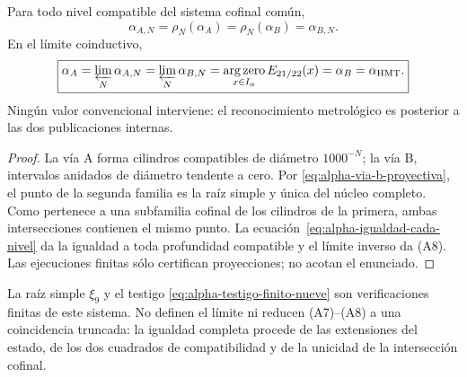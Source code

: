 \begin{theorem}
\label{prop:alpha-dos-limites-historico-rev04}
Para todo nivel compatible del sistema cofinal común,
\begingroup
\renewcommand{\theequation}{A7}
\begin{equation}
 \boxed{\alpha_{A,N}=\rho_N(\alpha_A)
 =\rho_N(\alpha_B)=\alpha_{B,N}.}
 \label{eq:alpha-dos-vias-cada-nivel-historico-rev04}
\end{equation}
\endgroup
En el límite coinductivo,
\begingroup
\renewcommand{\theequation}{A8}
\begin{equation}
 \boxed{\alpha_A
 =\varprojlim_N\alpha_{A,N}
 =\varprojlim_N\alpha_{B,N}
 =\operatorname*{arg\,zero}_{x\in I_\alpha}E_{21/22}(x)
 =\alpha_B=\alpha_{\mathrm{HMT}}.}
 \label{eq:alpha-dos-vias-limite-coinductivo-historico-rev04}
\end{equation}
\endgroup
Ningún valor convencional interviene: el reconocimiento metrológico es
posterior a las dos publicaciones internas.
\end{theorem}

\begin{proof}
La vía A forma cilindros compatibles de diámetro \(1000^{-N}\); la vía B,
intervalos anidados de diámetro tendente a cero. Por
\eqref{eq:alpha-via-b-proyectiva}, el punto de la segunda familia es la raíz
simple y única del núcleo completo. Como pertenece a una subfamilia cofinal
de los cilindros de la primera, ambas intersecciones contienen el mismo punto.
La ecuación~\eqref{eq:alpha-igualdad-cada-nivel} da la igualdad a toda
profundidad compatible y el límite inverso da (A8). Las ejecuciones finitas
sólo certifican proyecciones; no acotan el enunciado.
\end{proof}

La raíz simple \(\xi_9\) y el testigo
\eqref{eq:alpha-testigo-finito-nueve} son verificaciones finitas de este
sistema. No definen el límite ni reducen (A7)--(A8) a una coincidencia
truncada: la igualdad completa procede de las extensiones del estado, de los
dos cuadrados de compatibilidad y de la unicidad de la intersección cofinal.
